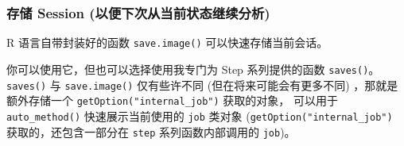 \documentclass[
]{article}
\newenvironment{Shaded}{\begin{snugshade}}{\end{snugshade}}
\newcommand{\CommentTok}[1]{\textcolor[rgb]{0.56,0.35,0.01}{\textit{#1}}}
\newcommand{\DataTypeTok}[1]{\textcolor[rgb]{0.13,0.29,0.53}{#1}}
\newcommand{\KeywordTok}[1]{\textcolor[rgb]{0.13,0.29,0.53}{\textbf{#1}}}
\newcommand{\NormalTok}[1]{#1}
\newcommand{\OperatorTok}[1]{\textcolor[rgb]{0.81,0.36,0.00}{\textbf{#1}}}
\newcommand{\StringTok}[1]{\textcolor[rgb]{0.31,0.60,0.02}{#1}}
\begin{document}
\begin{Shaded}
\end{Shaded}

\hypertarget{ux5b58ux50a8-session-ux4ee5ux4fbfux4e0bux6b21ux4eceux5f53ux524dux72b6ux6001ux7ee7ux7eedux5206ux6790}{%
\subsubsection{存储 Session (以便下次从当前状态继续分析)}\label{ux5b58ux50a8-session-ux4ee5ux4fbfux4e0bux6b21ux4eceux5f53ux524dux72b6ux6001ux7ee7ux7eedux5206ux6790}}

R 语言自带封装好的函数 \texttt{save.image()} 可以快速存储当前会话。

你可以使用它，但也可以选择使用我专门为 Step 系列提供的函数 \texttt{saves()}。
\texttt{saves()} 与 \texttt{save.image()} 仅有些许不同 (但在将来可能会有更多不同) ，那就是
额外存储一个 \texttt{getOption("internal\_job")} 获取的对象，
可以用于 \texttt{auto\_method()} 快速展示当前使用的 \texttt{job} 类对象
(\texttt{getOption("internal\_job")} 获取的，还包含一部分在 \texttt{step} 系列函数内部调用的 \texttt{job})。
\end{document}
